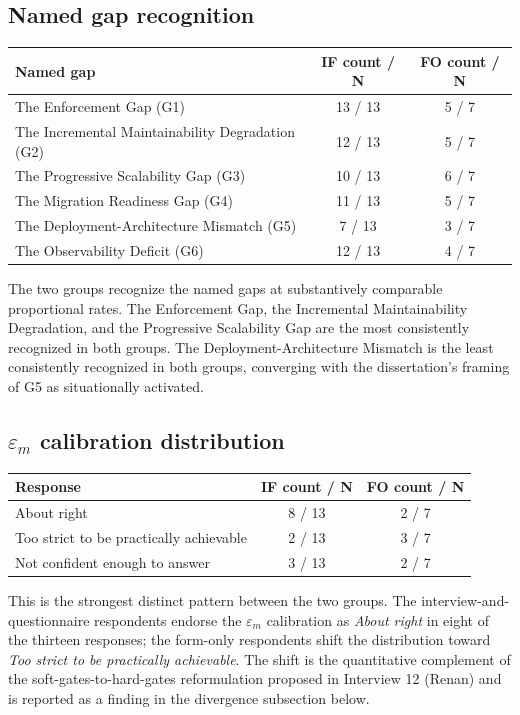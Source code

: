 \subsection*{Named gap recognition}

\begin{longtable}{p{5cm} c c}
\toprule
\textbf{Named gap} & \textbf{IF count / N} & \textbf{FO count / N} \\
\midrule
\endhead
The Enforcement Gap (G1) & 13 / 13 & 5 / 7 \\
The Incremental Maintainability Degradation (G2) & 12 / 13 & 5 / 7 \\
The Progressive Scalability Gap (G3) & 10 / 13 & 6 / 7 \\
The Migration Readiness Gap (G4) & 11 / 13 & 5 / 7 \\
The Deployment-Architecture Mismatch (G5) & 7 / 13 & 3 / 7 \\
The Observability Deficit (G6) & 12 / 13 & 4 / 7 \\
\bottomrule
\end{longtable}

\noindent
The two groups recognize the named gaps at substantively comparable proportional rates. The Enforcement Gap, the Incremental Maintainability Degradation, and the Progressive Scalability Gap are the most consistently recognized in both groups. The Deployment-Architecture Mismatch is the least consistently recognized in both groups, converging with the dissertation's framing of G5 as situationally activated.

\subsection*{$\varepsilon_m$ calibration distribution}

\begin{longtable}{p{6cm} c c}
\toprule
\textbf{Response} & \textbf{IF count / N} & \textbf{FO count / N} \\
\midrule
\endhead
About right & 8 / 13 & 2 / 7 \\
Too strict to be practically achievable & 2 / 13 & 3 / 7 \\
Not confident enough to answer & 3 / 13 & 2 / 7 \\
\bottomrule
\end{longtable}

\noindent
This is the strongest distinct pattern between the two groups. The interview-and-questionnaire respondents endorse the $\varepsilon_m$ calibration as \emph{About right} in eight of the thirteen responses; the form-only respondents shift the distribution toward \emph{Too strict to be practically achievable}. The shift is the quantitative complement of the soft-gates-to-hard-gates reformulation proposed in Interview 12 (Renan) and is reported as a finding in the divergence subsection below.

